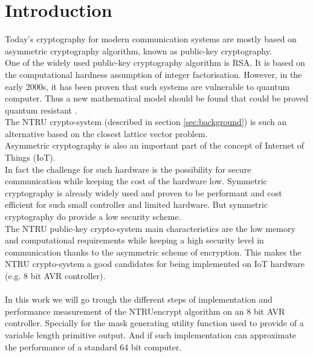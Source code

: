 \section{Introduction}
\label{sec:introduction}
Today's cryptography for modern communication systems are mostly based on asymmetric cryptography algorithm, known as public-key cryptography.\\ One of the widely used public-key cryptography algorithm is RSA\cite{jonsson_pkcs_nodate}. It is based on the computational hardness assumption of integer factorisation. However, in the early 2000s, it has been proven that such systems are vulnerable to quantum computer.
Thus a new mathematical model should be found that could be proved quantum resistant \cite{bernstein_post-quantum_2009-1}. \\
The NTRU crypto-system \cite{schanck_practical_2015} (described in section \ref{sec:background}) is such an alternative based on the closest lattice vector problem.\\
Asymmetric cryptography is also an important part of the concept of Internet of Things (IoT). \\In fact the challenge for such hardware is the possibility for secure communication while keeping the cost of the hardware low. Symmetric cryptography is already widely used and proven to be performant and cost efficient for such small controller and limited hardware. But symmetric cryptography do provide a low security scheme.\\
The NTRU public-key crypto-system main characteristics are the low memory and computational requirements while keeping a high security level in communication thanks to the asymmetric scheme of encryption. This makes the NTRU crypto-system a good candidates for being implemented on IoT hardware (e.g. 8 bit AVR controller).\\
\\
In this work we will go trough the different steps of implementation and performance measurement of  the NTRUencrypt algorithm on an 8 bit AVR controller. Specially for the mask generating utility function used to provide of a variable length primitive output. And if such implementation can approximate the performance of a standard 64 bit computer. 